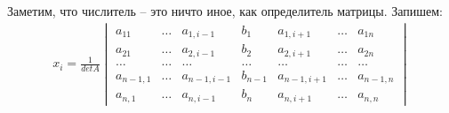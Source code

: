 \begin{answer}
Заметим, что числитель -- это ничто иное, как определитель матрицы. Запишем:
\begin{gather*}
  x_i = \frac{1}{det A} 
    \begin{vmatrix}
      a_{11} & \ldots & a_{1,i-1} & b_1 & a_{1,i+1} & \ldots & a_{1n} \\ 
      a_{21} & \ldots & a_{2,i-1} & b_2 & a_{2,i+1} & \ldots & a_{2n} \\ 
      \ldots & \ldots & \ldots & \ldots & \ldots & \ldots & \ldots \\
      a_{n-1,1} & \ldots & a_{n-1,i-1} & b_{n-1} & a_{n-1,i+1} & \ldots & a_{n-1,n} \\ 
      a_{n,1} & \ldots & a_{n,i-1} & b_{n} & a_{n,i+1} & \ldots & a_{n,n}
    \end{vmatrix}
\end{gather*}
\end{answer} 


